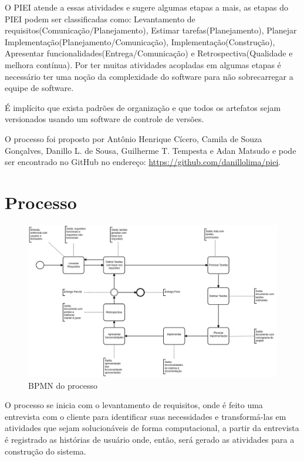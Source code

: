 \documentclass[	DIV=calc,%
							paper=a4,%
							fontsize=12pt,%
							onecolumn]{scrartcl}	 					%
\begin{document}
O PIEI atende a essas atividades e sugere algumas etapas a mais, as etapas do PIEI podem ser classificadas como: Levantamento de requisitos(Comunicação/Planejamento), Estimar tarefas(Planejamento), Planejar Implementação(Planejamento/Comunicação), Implementação(Construção), Apresentar funcionalidades(Entrega/Comunicação) e Retrospectiva(Qualidade e melhora contínua). Por ter muitas atividades acopladas em algumas etapas é necessário ter uma noção da complexidade do  software para não sobrecarregar a equipe de software.

É implícito que exista padrões de organização e que todos os artefatos sejam versionados usando um software de controle de versões.

O processo foi proposto por Antônio Henrique Cícero, Camila de Souza Gonçalves, Danillo L. de Sousa, Guilherme T. Tempesta e Adan Matsudo e pode ser encontrado no GitHub no endereço:  \href{https://github.com/danillolima/piei}{https://github.com/danillolima/piei}.

\section{Processo}
\begin{figure}[ht]
	\centering
	\includegraphics[width=\textwidth]{bpmn.png}
	\caption{BPMN do processo}
	\label{bpmn}
\end{figure}

O processo se inicia com o levantamento de requisitos, onde é feito uma entrevista com o cliente para identificar suas necessidades e transformá-las em atividades que sejam solucionáveis de forma computacional, a partir da entrevista é registrado as histórias de usuário onde, então, será gerado as atividades para a construção do sistema. 
\end{document}

